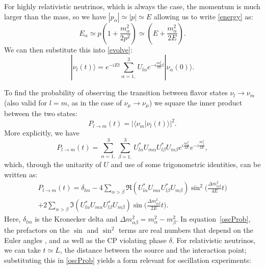 For highly relativistic neutrinos, which is always the case, the momentum is much larger than the mass, so we have $|p_\alpha| \simeq |p| \simeq E$ allowing us to write \eqref{energy} as:  
\begin{equation}\label{energyApprox}
E_\alpha \simeq p(1+\frac{m_\alpha^2}{2p^2})\simeq (E+\frac{m_\alpha^2}{2E}).
\end{equation}
We can then substitute this into \eqref{evolve}:
\begin{equation}\label{evolveSub}
|\nu_l(t) \rangle = e^{-iEt} \sum_{\alpha = 1,}^3 U_{l\alpha}e^{-i\frac{m_\alpha^2}{2E} t}|\nu_\alpha(0) \rangle.
\end{equation}

To find the probability of observing the transition between flavor states $\nu_l \rightarrow \nu_m$ (also valid for $l=m$, as in the case of $\nu_\mu \rightarrow \nu_\mu$) we square the inner product between the two states:
\begin{equation}\label{probSimp}
P_{l\rightarrow m}(t) = |\langle \nu_m | \nu_l(t)\rangle |^2.
\end{equation}
More explicitly, we have 
\begin{equation}\label{probComp}
P_{l\rightarrow m}(t) = \sum_{\alpha = 1,}^3 \sum_{\beta = 1,}^3 U^*_{l\alpha}U_{m\alpha}U^*_{l\beta}U_{m\beta} e^{i\frac{m_\alpha^2}{2E}} e^{-i\frac{m_\beta^2}{2E}}, 
\end{equation}
which, through the unitarity of $U$ and use of some trigonometric identities, can be written as:
\begin{equation}\begin{split}\label{oscProb}
P_{l\rightarrow m}(t) =  \delta_{lm} - 4  \sum_{\alpha > \beta}  \Re(U^*_{l\alpha}U_{m\alpha}U^*_{l\beta}U_{m\beta}) \sin^2 \bigg(\frac{\Delta m_{\alpha\beta}^2}{4E} t\bigg) \\
 + 2  \sum_{\alpha>\beta}  \Im(U^*_{l\alpha}U_{m\alpha}U^*_{l\beta}U_{m\beta}) \sin\bigg(\frac{\Delta m_{\alpha\beta}^2}{2E}t\bigg).
\end{split}\end{equation}
Here, $\delta_{lm}$ is the Kronecker delta and $\Delta m^2_{\alpha\beta} = m_\alpha^2 - m_\beta^2$.  In equation~\eqref{oscProb}, the prefactors on the $\sin$ and $\sin^2$ terms are real numbers that depend on the Euler angles \thetaot, \thetatth and \thetaoth as well as the CP violating phase $\delta$.  For relativistic neutrinos, we can take $t \simeq L$, the distance between the source and the interaction point; substituting this in \eqref{oscProb} yields a form relevant for oscillation experiments:
